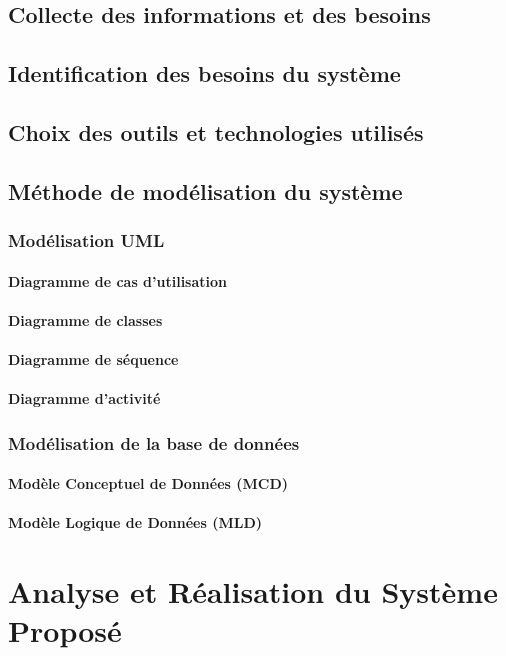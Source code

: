 \documentclass[12pt,a4paper,oneside]{memoir}
\begin{document}
	\section{Collecte des informations et des besoins}
	\section{Identification des besoins du système}
	\section{Choix des outils et technologies utilisés}
	\section{Méthode de modélisation du système}
	\subsection{Modélisation UML}
	\subsubsection{Diagramme de cas d'utilisation}
	\subsubsection{Diagramme de classes}
	\subsubsection{Diagramme de séquence}
	\subsubsection{Diagramme d'activité}
	\subsection{Modélisation de la base de données}
	\subsubsection{Modèle Conceptuel de Données (MCD)}
	\subsubsection{Modèle Logique de Données (MLD)}
	
	\chapter{Analyse et Réalisation du Système Proposé}
\end{document}
